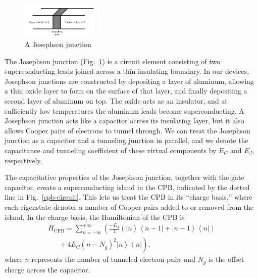 \documentclass[twocolumn]{revtex4}
\newcommand{\bra}[1]{\left< #1 \right|}
\newcommand{\ket}[1]{\left| #1 \right>}
\newcommand{\figwidth}{0.33\textwidth}
\begin{document}
\begin{figure}
  \includegraphics[width=\figwidth]{junction.png}
  \caption{ A Josephson junction }
  \label{junction}
\end{figure}

The Josephson junction (Fig.~\ref{junction}) is a circuit element
consisting of two superconducting leads joined across a thin
insulating boundary. In our devices, Josephson junctions are
constructed by depositing a layer of aluminum, allowing a thin oxide
layer to form on the surface of that layer, and finally depositing a
second layer of aluminum on top. The oxide acts as an insulator, and
at sufficiently low temperatures the aluminum leads become
superconducting. A Josephson junction acts like a capacitor across its
insulating layer, but it also allows Cooper pairs of electrons to
tunnel through. We can treat the Josephson junction as a capacitor and
a tunneling junction in parallel, and we denote the capacitance and
tunneling coefficient of these virtual components by $E_C$ and $E_J$,
respectively.

The capacitative properties of the Josephson junction, together with
the gate capacitor, create a superconducting island in the CPB,
indicated by the dotted line in Fig.~\ref{cpb-circuit}. This lets us
treat the CPB in its ``charge basis,'' where each eigenstate denotes a
number of Cooper pairs added to or removed from the island. In the
charge basis, the Hamiltonian of the CPB is
\begin{multline}
\label{cpb-H}
  H_{\text{CPB}} = \sum_{n=-\infty}^{+\infty} \left(\frac{-E_J}{2}\left(
      \ket{n}\bra{n-1} + \ket{n-1}\bra{n} \right)\right. \\
  \left.\phantom{\frac{-E_J}{2}} + 4E_C(n-N_g)^2\ket{n}\bra{n}\right),
\end{multline}
where $n$ represents the number of tunneled electron pairs and $N_g$
is the offset charge across the capacitor.
\end{document}
